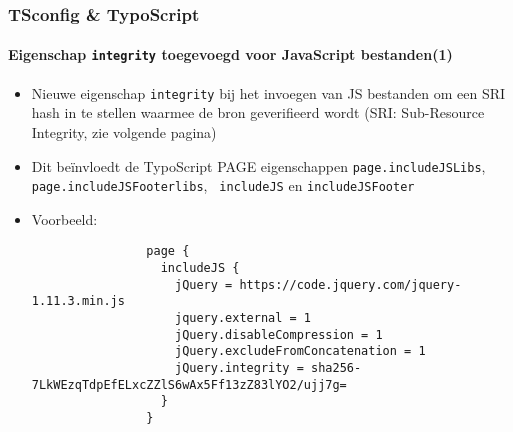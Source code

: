 \begin{frame}[fragile]
	\frametitle{TSconfig \& TypoScript}
	\framesubtitle{Eigenschap \texttt{integrity} toegevoegd voor JavaScript bestanden(1)}

	\lstset{basicstyle=\tiny\ttfamily}

	\begin{itemize}

		\item Nieuwe eigenschap \texttt{integrity} bij het invoegen van JS bestanden
			om een SRI hash in te stellen waarmee de bron geverifieerd wordt\newline
			(SRI: Sub-Resource Integrity, zie volgende pagina)

		\item Dit beïnvloedt de TypoScript PAGE eigenschappen \texttt{page.includeJSLibs},
			\texttt{page.includeJSFooterlibs}, \texttt{ includeJS} en
			\texttt{includeJSFooter}

		\item Voorbeeld:

			\begin{lstlisting}
				page {
				  includeJS {
				    jQuery = https://code.jquery.com/jquery-1.11.3.min.js
				    jquery.external = 1
				    jQuery.disableCompression = 1
				    jQuery.excludeFromConcatenation = 1
				    jQuery.integrity = sha256-7LkWEzqTdpEfELxcZZlS6wAx5Ff13zZ83lYO2/ujj7g=
				  }
				}
			\end{lstlisting}

	\end{itemize}

\end{frame}


